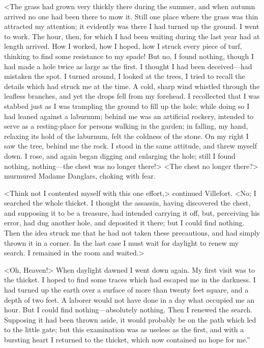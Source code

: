  <The grass had grown very thickly there during the summer, and when autumn arrived no one had been there to mow it. Still one place where the grass was thin attracted my attention; it evidently was there I had turned up the ground. I went to work. The hour, then, for which I had been waiting during the last year had at length arrived. How I worked, how I hoped, how I struck every piece of turf, thinking to find some resistance to my spade! But no, I found nothing, though I had made a hole twice as large as the first. I thought I had been deceived—had mistaken the spot. I turned around, I looked at the trees, I tried to recall the details which had struck me at the time. A cold, sharp wind whistled through the leafless branches, and yet the drops fell from my forehead. I recollected that I was stabbed just as I was trampling the ground to fill up the hole; while doing so I had leaned against a laburnum; behind me was an artificial rockery, intended to serve as a resting-place for persons walking in the garden; in falling, my hand, relaxing its hold of the laburnum, felt the coldness of the stone. On my right I saw the tree, behind me the rock. I stood in the same attitude, and threw myself down. I rose, and again began digging and enlarging the hole; still I found nothing, nothing—the chest was no longer there!>  <The chest no longer there?> murmured Madame Danglars, choking with fear. 

 <Think not I contented myself with this one effort,> continued Villefort. <No; I searched the whole thicket. I thought the assassin, having discovered the chest, and supposing it to be a treasure, had intended carrying it off, but, perceiving his error, had dug another hole, and deposited it there; but I could find nothing. Then the idea struck me that he had not taken these precautions, and had simply thrown it in a corner. In the last case I must wait for daylight to renew my search. I remained in the room and waited.> 

 <Oh, Heaven!>  When daylight dawned I went down again. My first visit was to the thicket. I hoped to find some traces which had escaped me in the darkness. I had turned up the earth over a surface of more than twenty feet square, and a depth of two feet. A laborer would not have done in a day what occupied me an hour. But I could find nothing—absolutely nothing. Then I renewed the search. Supposing it had been thrown aside, it would probably be on the path which led to the little gate; but this examination was as useless as the first, and with a bursting heart I returned to the thicket, which now contained no hope for me.” 

